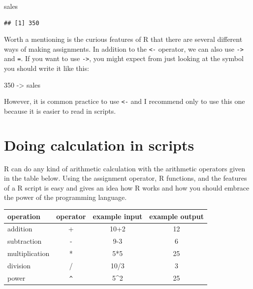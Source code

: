 \documentclass[
  12pt,
  oneside]{book}
\newenvironment{Shaded}{\begin{snugshade}}{\end{snugshade}}
\newcommand{\DecValTok}[1]{\textcolor[rgb]{0.00,0.00,0.81}{#1}}
\newcommand{\NormalTok}[1]{#1}
\newcommand{\OtherTok}[1]{\textcolor[rgb]{0.56,0.35,0.01}{#1}}
\theoremstyle{definition}
\theoremstyle{definition}
\theoremstyle{definition}
\theoremstyle{definition}
\theoremstyle{remark}
\begin{document}
\begin{Shaded}
\begin{Highlighting}[]
\NormalTok{sales}
\end{Highlighting}
\end{Shaded}

\begin{verbatim}
## [1] 350
\end{verbatim}

Worth a mentioning is the curious features of R that there are several different ways of making assignments. In addition to the \texttt{\textless{}-} operator, we can also use \texttt{-\textgreater{}} and \texttt{=}. If you want to use \texttt{-\textgreater{}}, you might expect from just looking at the symbol you should write it like this:

\begin{Shaded}
\begin{Highlighting}[]
\DecValTok{350} \OtherTok{{-}\textgreater{}}\NormalTok{ sales}
\end{Highlighting}
\end{Shaded}

However, it is common practice to use \texttt{\textless{}-} and I recommend only to use this one because it is easier to read in scripts.

\hypertarget{doing-calculation-in-scripts}{%
\section{Doing calculation in scripts}\label{doing-calculation-in-scripts}}

R can do any kind of arithmetic calculation with the arithmetic operators given in the table below. Using the assignment operator, R functions, and the features of a R script is easy and gives an idea how R works and how you should embrace the power of the programming language.

\begin{longtable}[]{@{}lccc@{}}
\toprule\noalign{}
operation & operator & example input & example output \\
\midrule\noalign{}
\endhead
\bottomrule\noalign{}
\endlastfoot
addition & + & 10+2 & 12 \\
subtraction & - & 9-3 & 6 \\
multiplication & * & 5*5 & 25 \\
division & / & 10/3 & 3 \\
power & \texttt{\^{}} & 5\^{}2 & 25 \\
\end{longtable}
\end{document}

